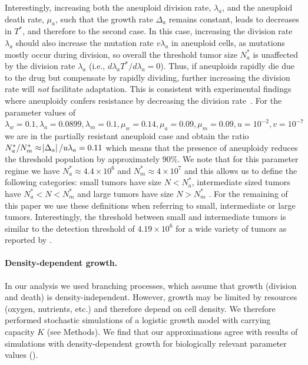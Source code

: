 \documentclass[12pt]{extarticle}
\begin{document}
Interestingly, increasing both the aneuploid division rate, $\lambda_a$, and the aneuploid death rate, $\mu_a$, such that the growth rate $\Delta_a$ remains constant, leads to decreases in $T^*$, and therefore to the second case. In this case, increasing the division rate $\lambda_a$ should also increase the mutation rate $v\lambda_a$ in aneuploid cells, as mutations mostly occur during division, so overall the threshold tumor size $N_a^*$ is unaffected by the division rate $\lambda_a$ (i.e., $d \lambda_a T^*/d\lambda_a = 0$). Thus, if aneuploids rapidly die due to the drug but compensate by rapidly dividing, further increasing  the division rate will \emph{not} facilitate adaptation. This is consistent with experimental findings where aneuploidy confers resistance by decreasing the division rate~\citep{replogle2020aneuploidy}.
For the parameter values of  $\lambda_w=0.1, \lambda_a=0.0899,\lambda_m=0.1,\mu_w=0.14,\mu_a=0.09,\mu_m=0.09, u=10^{-2}, v=10^{-7}$ we are in the partially resistant aneuploid case and obtain the ratio $N^*_a/N^*_m\approx\abs{\Delta_a}/u\lambda_a=0.11$ which means that the presence of aneuploidy reduces the threshold population by approximately $90\%$. We note that for this parameter regime we have $N_a^*\approx4.4\times10^6$ and $N_m^*\approx4\times10^7$ and this allows us to define the following categories: small tumors have size $N<N_a^*$, intermediate sized tumors have $N_a^*<N<N_m^*$ and large tumors have size $N>N_m^*$ . For the remaining of this paper we use these definitions when referring to small, intermediate or large tumors. Interestingly, the threshold between small and intermediate tumors is similar to the detection threshold of $4.19\times10^6$ for a wide variety of tumors as reported by \citet{avanzini2019cancer}. %
\paragraph*{Density-dependent growth.}

In our analysis we used branching processes, which assume that growth (division and death) is density-independent. However, growth may be limited by resources (oxygen, nutrients, etc.) and therefore depend on cell density. 
We therefore performed stochastic simulations of a logistic growth model with carrying capacity $K$ (see Methods). 
We find that our approximations agree with results of simulations with density-dependent growth for biologically relevant parameter values ().
\end{document}

